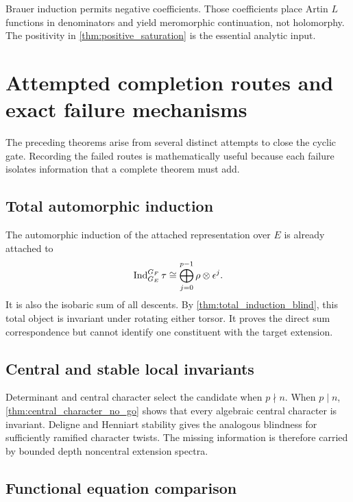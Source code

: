 \begin{remark}\label{rem:brauer_signed}
Brauer induction permits negative coefficients. Those coefficients place Artin \(L\) functions in denominators and yield meromorphic continuation, not holomorphy. The positivity in \cref{thm:positive_saturation} is the essential analytic input.
\end{remark}

\section{Attempted completion routes and exact failure mechanisms}\label{sec:attempted_routes}

The preceding theorems arise from several distinct attempts to close the cyclic gate. Recording the failed routes is mathematically useful because each failure isolates information that a complete theorem must add.

\subsection{Total automorphic induction}

The automorphic induction of the attached representation over \(E\) is already attached to
\[
 \operatorname{Ind}_{G_E}^{G_F}\tau
 \cong
 \bigoplus_{j=0}^{p-1}
 \rho\otimes\epsilon^j.
\]
It is also the isobaric sum of all descents. By \cref{thm:total_induction_blind}, this total object is invariant under rotating either torsor. It proves the direct sum correspondence but cannot identify one constituent with the target extension.

\subsection{Central and stable local invariants}

Determinant and central character select the candidate when \(p\nmid n\). When \(p\mid n\), \cref{thm:central_character_no_go} shows that every algebraic central character is invariant. Deligne and Henniart stability gives the analogous blindness for sufficiently ramified character twists. The missing information is therefore carried by bounded depth noncentral extension spectra.

\subsection{Functional equation comparison}

